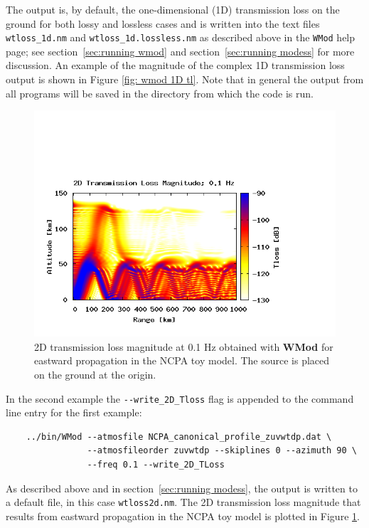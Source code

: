 The output is, by default, the one-dimensional (1D) transmission loss on the ground for both lossy and lossless cases and is written into the text files \verb+wtloss_1d.nm+ and \verb+wtloss_1d.lossless.nm+ as described above in the \verb+WMod+ help page; see section~\ref{sec:running wmod} and section~\ref{sec:running modess} for more discussion.  An example of the magnitude of the complex 1D transmission loss output is shown in Figure \ref{fig: wmod 1D tl}. Note that in general the output from all programs will be saved in the directory from which the code is run.  

\begin{figure}
\begin{center}
\includegraphics[scale=0.45,trim = 20 20 110 140,clip]{figs/wmod_ex2}
\end{center}
\caption{2D transmission loss magnitude at 0.1 Hz obtained with {\bf WMod} for eastward propagation in the NCPA toy model. The source is placed on the ground at the origin.}
\label{fig: wmod 2D tl}
\end{figure}

\newpage

In the second example the \verb+--write_2D_Tloss+ flag is appended to the command line entry for the first example: 
\begin{verbatim} 
    ../bin/WMod --atmosfile NCPA_canonical_profile_zuvwtdp.dat \ 
                --atmosfileorder zuvwtdp --skiplines 0 --azimuth 90 \
                --freq 0.1 --write_2D_TLoss
\end{verbatim}
As described above and in section~\ref{sec:running modess}, the output is written to a default file, in this case \verb+wtloss2d.nm+. The 2D transmission loss magnitude that results from eastward propagation in the NCPA toy model is plotted in Figure \ref{fig: wmod 2D tl}. 

